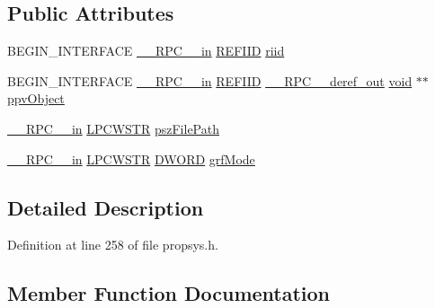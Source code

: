 \subsection*{Public Attributes}
\begin{DoxyCompactItemize}
\item 
B\+E\+G\+I\+N\+\_\+\+I\+N\+T\+E\+R\+F\+A\+CE \hyperlink{rpcsal_8h_a20b7f6da600a05c8b541659f14f7f0e6}{\+\_\+\+\_\+\+R\+P\+C\+\_\+\+\_\+in} \hyperlink{px__win__ds_8c_a80ec49c8ae61e234197d5071d2df497d}{R\+E\+F\+I\+ID} \hyperlink{struct_i_initialize_with_file_vtbl_a738c925524e4e77f3b04c663a064491c}{riid}
\item 
B\+E\+G\+I\+N\+\_\+\+I\+N\+T\+E\+R\+F\+A\+CE \hyperlink{rpcsal_8h_a20b7f6da600a05c8b541659f14f7f0e6}{\+\_\+\+\_\+\+R\+P\+C\+\_\+\+\_\+in} \hyperlink{px__win__ds_8c_a80ec49c8ae61e234197d5071d2df497d}{R\+E\+F\+I\+ID} \hyperlink{rpcsal_8h_a23bc188526f10656f9c79d950f6c3192}{\+\_\+\+\_\+\+R\+P\+C\+\_\+\+\_\+deref\+\_\+out} \hyperlink{sound_8c_ae35f5844602719cf66324f4de2a658b3}{void} $\ast$$\ast$ \hyperlink{struct_i_initialize_with_file_vtbl_a76d5da0977abf7d256d5ac6afea06830}{ppv\+Object}
\item 
\hyperlink{rpcsal_8h_a20b7f6da600a05c8b541659f14f7f0e6}{\+\_\+\+\_\+\+R\+P\+C\+\_\+\+\_\+in} \hyperlink{mapinls_8h_a25fda90f83ded0efd5456a4e7eda1e0c}{L\+P\+C\+W\+S\+TR} \hyperlink{struct_i_initialize_with_file_vtbl_acf1458af574fc8d211b3f16bd5e03f35}{psz\+File\+Path}
\item 
\hyperlink{rpcsal_8h_a20b7f6da600a05c8b541659f14f7f0e6}{\+\_\+\+\_\+\+R\+P\+C\+\_\+\+\_\+in} \hyperlink{mapinls_8h_a25fda90f83ded0efd5456a4e7eda1e0c}{L\+P\+C\+W\+S\+TR} \hyperlink{mapinls_8h_ad342ac907eb044443153a22f964bf0af}{D\+W\+O\+RD} \hyperlink{struct_i_initialize_with_file_vtbl_a4e4df77bf98daf5957d205e6451cd477}{grf\+Mode}
\end{DoxyCompactItemize}


\subsection{Detailed Description}


Definition at line 258 of file propsys.\+h.



\subsection{Member Function Documentation}
